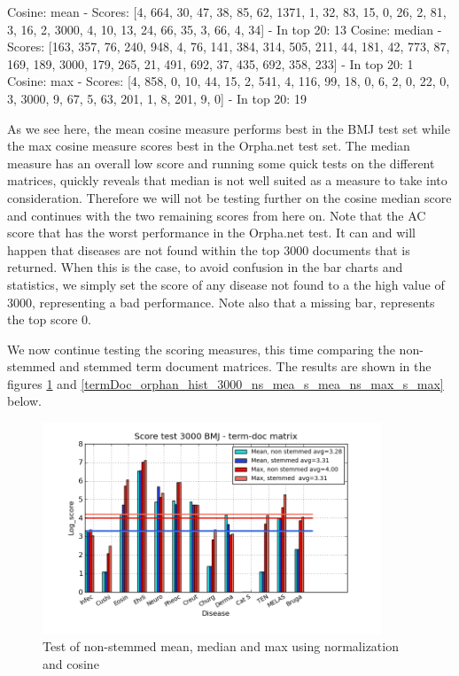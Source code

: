 Cosine: mean - Scores: [4, 664, 30, 47, 38, 85, 62, 1371, 1, 32, 83, 15, 0, 26, 2, 81, 3, 16, 2, 3000, 4, 10, 13, 24, 66, 35, 3, 66, 4, 34] - In top 20: 13
Cosine: median - Scores: [163, 357, 76, 240, 948, 4, 76, 141, 384, 314, 505, 211, 44, 181, 42, 773, 87, 169, 189, 3000, 179, 265, 21, 491, 692, 37, 435, 692, 358, 233] - In top 20: 1 
Cosine: max - Scores: [4, 858, 0, 10, 44, 15, 2, 541, 4, 116, 99, 18, 0, 6, 2, 0, 22, 0, 3, 3000, 9, 67, 5, 63, 201, 1, 8, 201, 9, 0] - In top 20: 19

As we see here, the mean cosine measure performs best in the BMJ test set while the max cosine measure scores best in the Orpha.net test set. The median measure has an overall low score and running some quick tests on the different matrices, quickly reveals that median is not well suited as a measure to take into consideration. Therefore we will not be testing further on the cosine median score and continues with the two remaining scores from here on. Note that the AC score that has the worst performance in the Orpha.net test. It can and will happen that diseases are not found within the top 3000 documents that is returned. When this is the case, to avoid confusion in the bar charts and statistics, we simply set the score of any disease not found to a the high value of 3000, representing a bad performance. Note also that a missing bar, represents the top score 0.

We now continue testing the scoring measures, this time comparing the non-stemmed and stemmed term document matrices. The results are shown in the figures \ref{termDoc_bmj_hist_3000_ns_mea_s_mea_ns_max_s_max} and \ref{termDoc_orphan_hist_3000_ns_mea_s_mea_ns_max_s_max} below.

\begin{figure}[h!]
        \begin{center}
          \includegraphics[width=0.9\textwidth]{barcharts/termDoc_bmj_hist_3000_ns_mea_s_mea_ns_max_s_max.png}
        \end{center}
        \caption{Test of non-stemmed mean, median and max using normalization and cosine}
        \label{termDoc_bmj_hist_3000_ns_mea_s_mea_ns_max_s_max}
\end{figure}


